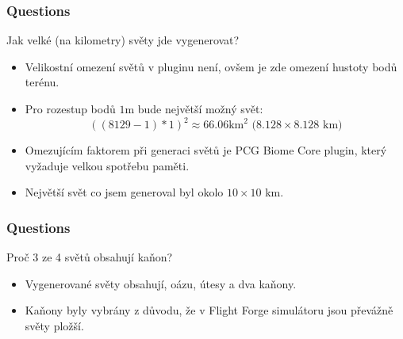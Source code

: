 \documentclass[aspectratio=169,9pt]{beamer}
\begin{document}
	

\begin{frame}
\frametitle{Questions}	

\centering
\begin{minipage}{0.7\textwidth}
	\begin{block}{Jak velké (na kilometry) světy jde vygenerovat?}
		\begin{itemize}
			\item Velikostní omezení světů v pluginu není, ovšem je zde omezení hustoty bodů terénu. 
			\item Pro rozestup bodů $1$m bude největší možný svět:
			\begin{equation*}
				((8129 - 1) * 1)^2 \approx 66.06\text{km}^2\text{ ($8.128\times8.128$ km)}
			\end{equation*}
			\item Omezujícím faktorem při generaci světů je PCG Biome Core plugin, který vyžaduje velkou spotřebu paměti.
			\item Největší svět co jsem generoval byl okolo $10\times10$ km.
		\end{itemize}
	\end{block}
\end{minipage}
	
\end{frame}

\begin{frame}
\frametitle{Questions}	

\centering
\begin{minipage}{0.7\textwidth}
	\begin{block}{Proč 3 ze 4 světů obsahují kaňon?}
		\begin{itemize}
			\item Vygenerované světy obsahují, oázu, útesy a dva kaňony.
			\item Kaňony byly vybrány z důvodu, že v Flight Forge simulátoru jsou převážně světy pložší.
		\end{itemize}
	\end{block}
\end{minipage}
	
\end{frame}
\end{document}
